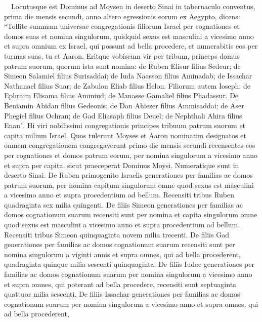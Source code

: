 
\begin{biblechapter}   Locutusque est Dominus ad Moysen in deserto Sinai in tabernaculo conventus, prima die mensis secundi, anno altero egressionis eorum ex Aegypto, dicens: 
\verse “Tollite summam universae congregationis filiorum Israel per cognationes et domos suas et nomina singulorum, quidquid sexus est masculini 
\verse a vicesimo anno et supra omnium ex Israel, qui possunt ad bella procedere, et numerabitis eos per turmas suas, tu et Aaron. 
\verse Eritque vobiscum vir per tribum, princeps domus patrum suorum, 
\verse quorum ista sunt nomina: de Ruben Elisur filius Sedeur; 
\verse de Simeon Salamiel filius Surisaddai; 
\verse de Iuda Naasson filius Aminadab; 
\verse de Issachar Nathanael filius Suar; 
\verse de Zabulon Eliab filius Helon. 
\verse Filiorum autem Ioseph: de Ephraim Elisama filius Ammiud; de Manasse Gamaliel filius Phadassur. 
\verse De Beniamin Abidan filius Gedeonis; 
\verse de Dan Ahiezer filius Ammisaddai;  
\verse de Aser Phegiel filius Ochran; 
\verse de Gad Eliasaph filius Deuel; 
\verse de Nephthali Ahira filius Enan". 
\verse Hi viri nobilissimi congregationis principes tribuum patrum suorum et capita milium Israel. 
\verse Quos tulerunt Moyses et Aaron nominatim designatos 
\verse et omnem congregationem congregaverunt primo die mensis secundi recensentes eos per cognationes et domos patrum eorum, per nomina singulorum a vicesimo anno et supra per capita, 
\verse sicut praeceperat Dominus Moysi. Numeratique sunt in deserto Sinai. 
\verse De Ruben primogenito Israelis generationes per familias ac domos patrum suorum, per nomina capitum singulorum omne quod sexus est masculini a vicesimo anno et supra procedentium ad bellum. 
\verse Recensiti tribus Ruben quadraginta sex milia quingenti. 
\verse De filiis Simeon generationes per familias ac domos cognationum suarum recensiti sunt per nomina et capita singulorum omne quod sexus est masculini a vicesimo anno et supra procedentium ad bellum. 
\verse Recensiti tribus Simeon quinquaginta novem milia trecenti. 
\verse De filiis Gad generationes per familias ac domos cognationum suarum recensiti sunt per nomina singulorum a viginti annis et supra omnes, qui ad bella procederent, 
\verse quadraginta quinque milia sescenti quinquaginta. 
\verse De filiis Iudae generationes per familias ac domos cognationum suarum per nomina singulorum a vicesimo anno et supra omnes, qui poterant ad bella procedere, 
\verse recensiti sunt septuaginta quattuor milia sescenti. 
\verse De filiis Issachar generationes per familias ac domos cognationum suarum per nomina singulorum a vicesimo anno et supra omnes, qui ad bella procederent,  

\end{biblechapter}
